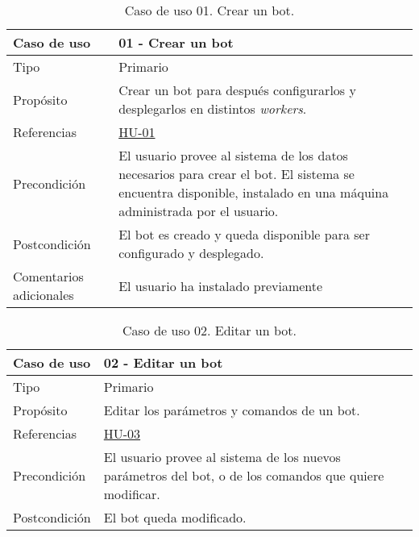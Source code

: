 \begin{table}[H]
    \centering
    \def\arraystretch{1.25}
    \begin{adjustbox}{max width=\textwidth}
    \begin{tabularx}{\textwidth}{|l|L|}
    \hline
        \textbf{Caso de uso} & \textbf{01 - Crear un bot} \\ \hline
    \hline
        Tipo & Primario \\ \hline
        Propósito & Crear un bot para después configurarlos y desplegarlos en distintos \textit{workers}. \\ \hline
        Referencias & \hyperref[sec:hu01]{HU-01} \\ \hline
        Precondición & El usuario provee al sistema de los datos necesarios para crear el bot. El sistema se encuentra disponible, instalado en una máquina administrada por el usuario.\\ \hline
        Postcondición & El bot es creado y queda disponible para ser configurado y desplegado. \\ \hline
        Comentarios adicionales & El usuario ha instalado previamente 
    \end{tabularx}
    \end{adjustbox}
    \caption{Caso de uso 01. Crear un bot.}
\end{table}

\begin{table}[H]
    \centering
    \def\arraystretch{1.25}
    \begin{adjustbox}{max width=\textwidth}
    \begin{tabularx}{\textwidth}{|l|L|}
    \hline
        \textbf{Caso de uso} & \textbf{02 - Editar un bot} \\ \hline
    \hline
        Tipo & Primario \\ \hline
        Propósito & Editar los parámetros y comandos de un bot. \\ \hline
        Referencias & \hyperref[sec:hu03]{HU-03}\\ \hline
        Precondición & El usuario provee al sistema de los nuevos parámetros del bot, o de los comandos que quiere modificar. \\ \hline
        Postcondición & El bot queda modificado. \\ \hline
    \end{tabularx}
    \end{adjustbox}
    \caption{Caso de uso 02. Editar un bot.}
\end{table}

